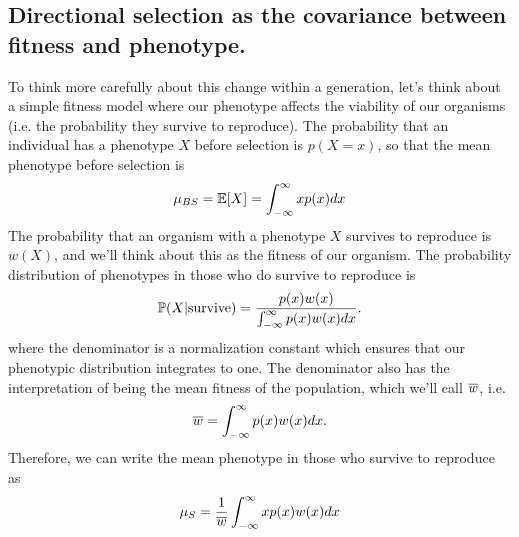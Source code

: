\subsection{Directional selection as the covariance between fitness and
phenotype.}
To think more carefully about this change within a
generation, let's think about a simple fitness model where our phenotype affects the
viability of our organisms (i.e. the probability they survive to
reproduce). The probability that an individual has a phenotype $X$
before selection is $p(X=x)$, so that the mean phenotype before
selection is
\begin{equation}
\mu_{BS} = \E[X] =  \int_{-\infty}^{\infty} x p(x) dx
\end{equation}
The probability that an organism with a phenotype $X$ survives to
reproduce is $w(X)$, and we'll think about this as the fitness of
our organism. The probability distribution of phenotypes in those who
do survive to reproduce is
\begin{equation}
\P(X | \textrm{survive}) =  \frac{p(x) w(x)}{
\int_{-\infty}^{\infty} p(x) w(x) dx}.
\end{equation}
where the denominator is a normalization constant which ensures that
our phenotypic distribution integrates to one. The denominator also
has the interpretation of being the mean fitness of the population,
which we'll call $\wbar$, i.e.  
\begin{equation}
\wbar =  \int_{-\infty}^{\infty} p(x) w(x) dx. \label{eqn:pheno_mean_fitness}
\end{equation}
Therefore, we can write the mean phenotype in those who survive to
reproduce as
\begin{equation}
\mu_S = \frac{1}{\wbar}\int_{-\infty}^{\infty} x p(x) w(x) dx
\end{equation}
